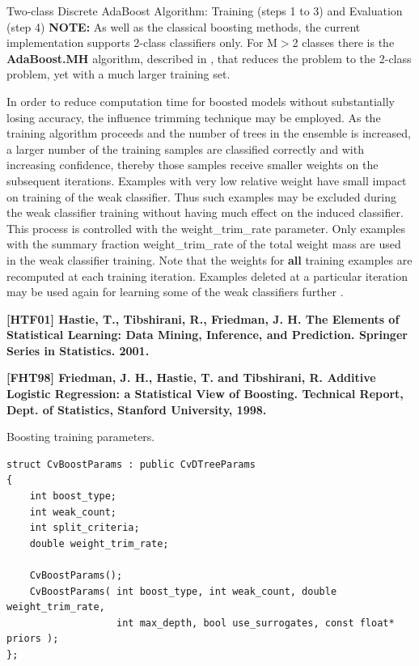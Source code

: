 Two-class Discrete AdaBoost Algorithm: Training (steps 1 to 3) and Evaluation (step 4)
\newline
\newline
\textbf{NOTE:} As well as the classical boosting methods, the current implementation supports 2-class classifiers only. For M$>$2 classes there is the \textbf{AdaBoost.MH} algorithm, described in , that reduces the problem to the 2-class problem, yet with a much larger training set.

In order to reduce computation time for boosted models without substantially losing accuracy, the influence trimming technique may be employed. As the training algorithm proceeds and the number of trees in the ensemble is increased, a larger number of the training samples are classified correctly and with increasing confidence, thereby those samples receive smaller weights on the subsequent iterations. Examples with very low relative weight have small impact on training of the weak classifier. Thus such examples may be excluded during the weak classifier training without having much effect on the induced classifier. This process is controlled with the weight\_trim\_rate parameter. Only examples with the summary fraction weight\_trim\_rate of the total weight mass are used in the weak classifier training. Note that the weights for \textbf{all} training examples are recomputed at each training iteration. Examples deleted at a particular iteration may be used again for learning some of the weak classifiers further .

\textbf{[HTF01] Hastie, T., Tibshirani, R., Friedman, J. H. The Elements of Statistical Learning: Data Mining, Inference, and Prediction. Springer Series in Statistics. 2001.}

\textbf{[FHT98] Friedman, J. H., Hastie, T. and Tibshirani, R. Additive Logistic Regression: a Statistical View of Boosting. Technical Report, Dept. of Statistics, Stanford University, 1998.}


Boosting training parameters.

\begin{lstlisting}
struct CvBoostParams : public CvDTreeParams
{
    int boost_type;
    int weak_count;
    int split_criteria;
    double weight_trim_rate;

    CvBoostParams();
    CvBoostParams( int boost_type, int weak_count, double weight_trim_rate,
                   int max_depth, bool use_surrogates, const float* priors );
};
\end{lstlisting}

